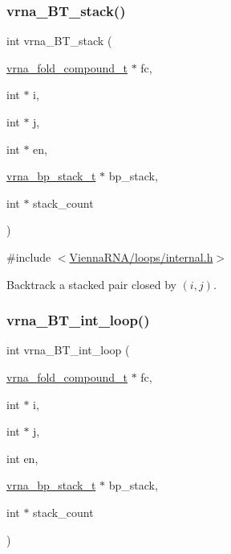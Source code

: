 \subsubsection{\texorpdfstring{vrna\_BT\_stack()}{vrna\_BT\_stack()}}
{\footnotesize\ttfamily int vrna\+\_\+\+B\+T\+\_\+stack (\begin{DoxyParamCaption}\item[{\mbox{\hyperlink{group__fold__compound_ga1b0cef17fd40466cef5968eaeeff6166}{vrna\+\_\+fold\+\_\+compound\+\_\+t}} $\ast$}]{fc,  }\item[{int $\ast$}]{i,  }\item[{int $\ast$}]{j,  }\item[{int $\ast$}]{en,  }\item[{\mbox{\hyperlink{group__data__structures_gaa651bda42e7692f08cb603cd6834b0ee}{vrna\+\_\+bp\+\_\+stack\+\_\+t}} $\ast$}]{bp\+\_\+stack,  }\item[{int $\ast$}]{stack\+\_\+count }\end{DoxyParamCaption})}



{\ttfamily \#include $<$\mbox{\hyperlink{internal_8h}{Vienna\+R\+N\+A/loops/internal.\+h}}$>$}



Backtrack a stacked pair closed by $ (i,j) $. 

\mbox{\label{group__mfe__backtracking_ga90b5a5723173996fb40640ce7c95c07e}} 
\subsubsection{\texorpdfstring{vrna\_BT\_int\_loop()}{vrna\_BT\_int\_loop()}}
{\footnotesize\ttfamily int vrna\+\_\+\+B\+T\+\_\+int\+\_\+loop (\begin{DoxyParamCaption}\item[{\mbox{\hyperlink{group__fold__compound_ga1b0cef17fd40466cef5968eaeeff6166}{vrna\+\_\+fold\+\_\+compound\+\_\+t}} $\ast$}]{fc,  }\item[{int $\ast$}]{i,  }\item[{int $\ast$}]{j,  }\item[{int}]{en,  }\item[{\mbox{\hyperlink{group__data__structures_gaa651bda42e7692f08cb603cd6834b0ee}{vrna\+\_\+bp\+\_\+stack\+\_\+t}} $\ast$}]{bp\+\_\+stack,  }\item[{int $\ast$}]{stack\+\_\+count }\end{DoxyParamCaption})}



